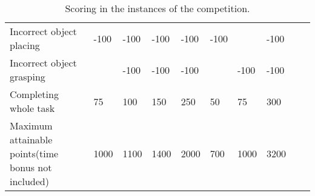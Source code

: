\begin{landscape}
\begin{table}
\begin{tabular}{|p{5.5cm}*{9}{|P{1cm}}|}
   Incorrect object placing                    & -100   & -100   & -100   & -100   & -100   &        & -100   \\
   Incorrect object grasping                   &        & -100   & -100   & -100   &        & -100   & -100   \\
   Completing whole task                       &   75   &  100   &  150   &  250   &   50   &   75   &  300   \\ \hline\hline
   Maximum attainable points\newline (time bonus not included)
	                                             & 1000   & 1100   & 1400   &  2000  &  700   &  1000  &  3200  \\ \hline
 \end{tabular}
 \caption{Scoring in the instances of the \RCAW \YEAR competition.}
  \label{tab:InstancePoints}
\end{table}
\end{landscape}
